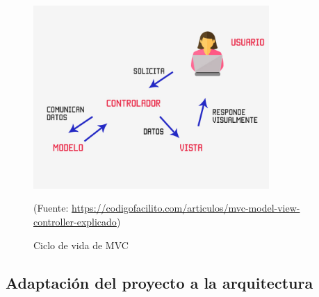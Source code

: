 \begin{figure}[h]
    \centering
    \includegraphics[width=0.8\textwidth]{imagenes/04_Analisis/ciclo_vida_MVC.jpg}
    \begin{center}
        (Fuente: \url{https://codigofacilito.com/articulos/mvc-model-view-controller-explicado})
    \end{center}
    \caption{Ciclo de vida de MVC}
\end{figure}

\subsection{Adaptación del proyecto a la arquitectura}


